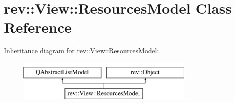 \hypertarget{classrev_1_1_view_1_1_resources_model}{}\section{rev\+::View\+::Resources\+Model Class Reference}
\label{classrev_1_1_view_1_1_resources_model}
Inheritance diagram for rev\+::View\+::Resources\+Model\+:\begin{figure}[H]
\begin{center}
\leavevmode
\includegraphics[height=2.000000cm]{classrev_1_1_view_1_1_resources_model}
\end{center}
\end{figure}
